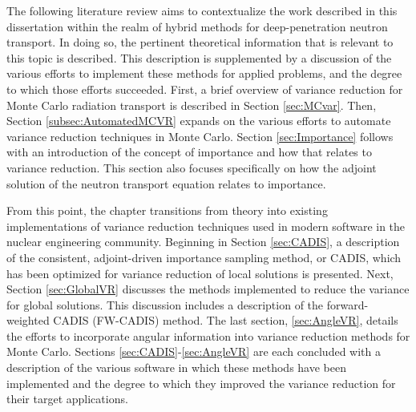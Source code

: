 The following literature review aims to contextualize the work described in this
dissertation within the realm of hybrid methods for deep-penetration
neutron transport. In doing
so, the pertinent theoretical information that is relevant to this
topic is described.
This description is supplemented by a
discussion of the various efforts to implement
these methods for applied problems, and the degree to which those efforts
succeeded.
First, a brief overview of variance reduction for Monte Carlo radiation transport
is described in Section \ref{sec:MCvar}.
Then, Section \ref{subsec:AutomatedMCVR} expands on the
various efforts to automate variance reduction techniques in Monte Carlo.
Section \ref{sec:Importance} follows with an introduction of the concept of
importance and how that relates to variance reduction. This section also
focuses specifically on how the adjoint solution of the neutron transport equation
relates to importance.

From this point, the chapter transitions
from theory into existing implementations
of variance reduction techniques used in modern software in the nuclear
engineering community. Beginning in Section \ref{sec:CADIS}, a description of
the consistent, adjoint-driven importance sampling method, or CADIS, which has
been optimized for variance reduction of local solutions is presented.
Next, Section
\ref{sec:GlobalVR} discusses the methods implemented to reduce the variance
for global solutions. This discussion includes a description of
the forward-weighted CADIS (FW-CADIS) method.
The last section, \ref{sec:AngleVR}, details the efforts to incorporate
angular information into variance reduction methods for Monte Carlo.
Sections \ref{sec:CADIS}-\ref{sec:AngleVR} are each
concluded with a description of the
various software in which these methods have been implemented and the degree to
which they improved the variance reduction for their target applications.
